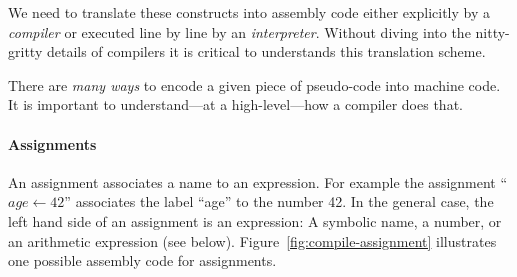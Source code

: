 \documentclass {aldast}
\begin{document}
We need to translate these constructs into assembly code either
explicitly by a \emph{compiler} or executed line by line by an
\emph{interpreter}. Without diving into the nitty-gritty details of
compilers it is critical to understands this translation scheme.

\begin{takeaway}
  There are \emph{many ways} to encode a given piece of pseudo-code
  into machine code. It is important to understand---at a
  high-level---how a compiler does that.
\end{takeaway}


\paragraph{Assignments}
 An assignment associates a name to an expression. For example the
assignment ``$\mathit{age} \gets 42$'' associates the label ``age'' to
the number 42. In the general case, the left hand side of an
assignment is an expression: A symbolic name, a number, or an
arithmetic expression (see below). Figure~\ref{fig:compile-assignment}
illustrates one possible assembly code for assignments.
  
\end{document}
